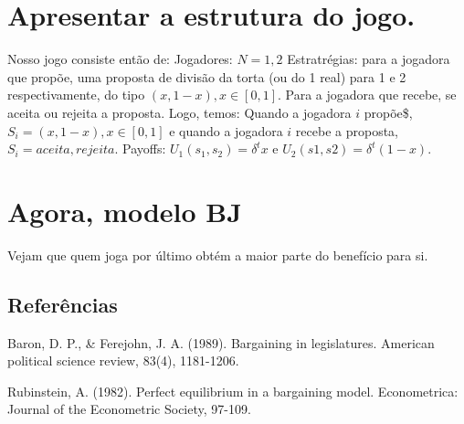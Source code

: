 \documentclass[
]{article}
\begin{document}
\hypertarget{apresentar-a-estrutura-do-jogo.}{%
\section{Apresentar a estrutura do
jogo.}\label{apresentar-a-estrutura-do-jogo.}}

Nosso jogo consiste então de: Jogadores: \(N = {1,2}\) Estratrégias:
para a jogadora que propõe, uma proposta de divisão da torta (ou do 1
real) para 1 e 2 respectivamente, do tipo \((x, 1-x), x \in [0,1]\).
Para a jogadora que recebe, se aceita ou rejeita a proposta. Logo,
temos: Quando a jogadora \(i\) propõe\$, \(S_i = (x, 1-x), x \in [0,1]\)
e quando a jogadora \(i\) recebe a proposta,
\(S_i = {aceita, rejeita}\). Payoffs: \(U_1(s_1, s_2) = \delta^t x\) e
\(U_2(s1, s2) = \delta^t (1-x)\).

\hypertarget{agora-modelo-bj}{%
\section{Agora, modelo BJ}\label{agora-modelo-bj}}

Vejam que quem joga por último obtém a maior parte do benefício para si.

\hypertarget{referuxeancias}{%
\subsection{Referências}\label{referuxeancias}}

Baron, D. P., \& Ferejohn, J. A. (1989). Bargaining in legislatures.
American political science review, 83(4), 1181-1206.

Rubinstein, A. (1982). Perfect equilibrium in a bargaining model.
Econometrica: Journal of the Econometric Society, 97-109.
\end{document}

